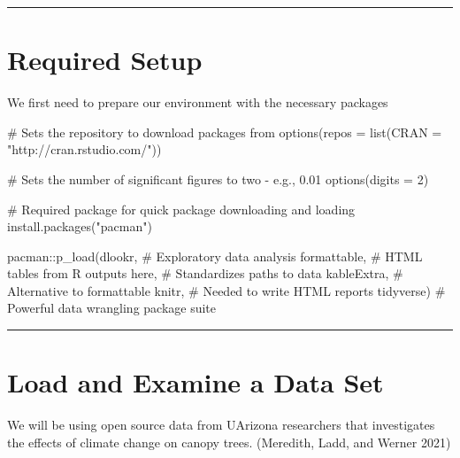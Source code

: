 \documentclass[
  letterpaper,
  DIV=11,
  numbers=noendperiod]{scrreprt}
\newenvironment{Shaded}{\begin{snugshade}}{\end{snugshade}}
\newcommand{\AttributeTok}[1]{\textcolor[rgb]{0.40,0.45,0.13}{#1}}
\newcommand{\CommentTok}[1]{\textcolor[rgb]{0.37,0.37,0.37}{#1}}
\newcommand{\DecValTok}[1]{\textcolor[rgb]{0.68,0.00,0.00}{#1}}
\newcommand{\FunctionTok}[1]{\textcolor[rgb]{0.28,0.35,0.67}{#1}}
\newcommand{\NormalTok}[1]{\textcolor[rgb]{0.00,0.23,0.31}{#1}}
\newcommand{\SpecialCharTok}[1]{\textcolor[rgb]{0.37,0.37,0.37}{#1}}
\newcommand{\StringTok}[1]{\textcolor[rgb]{0.13,0.47,0.30}{#1}}
\begin{document}
\begin{center}\rule{0.5\linewidth}{0.5pt}\end{center}

\hypertarget{required-setup-1}{%
\section{Required Setup}\label{required-setup-1}}

We first need to prepare our environment with the necessary packages

\begin{Shaded}
\begin{Highlighting}[]
\CommentTok{\# Sets the repository to download packages from}
\FunctionTok{options}\NormalTok{(}\AttributeTok{repos =} \FunctionTok{list}\NormalTok{(}\AttributeTok{CRAN =} \StringTok{"http://cran.rstudio.com/"}\NormalTok{))}

\CommentTok{\# Sets the number of significant figures to two {-} e.g., 0.01}
\FunctionTok{options}\NormalTok{(}\AttributeTok{digits =} \DecValTok{2}\NormalTok{)}

\CommentTok{\# Required package for quick package downloading and loading }
\FunctionTok{install.packages}\NormalTok{(}\StringTok{"pacman"}\NormalTok{)}

\NormalTok{pacman}\SpecialCharTok{::}\FunctionTok{p\_load}\NormalTok{(dlookr, }\CommentTok{\# Exploratory data analysis}
\NormalTok{               formattable, }\CommentTok{\# HTML tables from R outputs}
\NormalTok{               here, }\CommentTok{\# Standardizes paths to data}
\NormalTok{               kableExtra, }\CommentTok{\# Alternative to formattable}
\NormalTok{               knitr, }\CommentTok{\# Needed to write HTML reports}
\NormalTok{               tidyverse) }\CommentTok{\# Powerful data wrangling package suite}
\end{Highlighting}
\end{Shaded}

\begin{center}\rule{0.5\linewidth}{0.5pt}\end{center}

\hypertarget{load-and-examine-a-data-set-1}{%
\section{Load and Examine a Data
Set}\label{load-and-examine-a-data-set-1}}

We will be using open source data from UArizona researchers that
investigates the effects of climate change on canopy trees. (Meredith,
Ladd, and Werner 2021)
\end{document}
